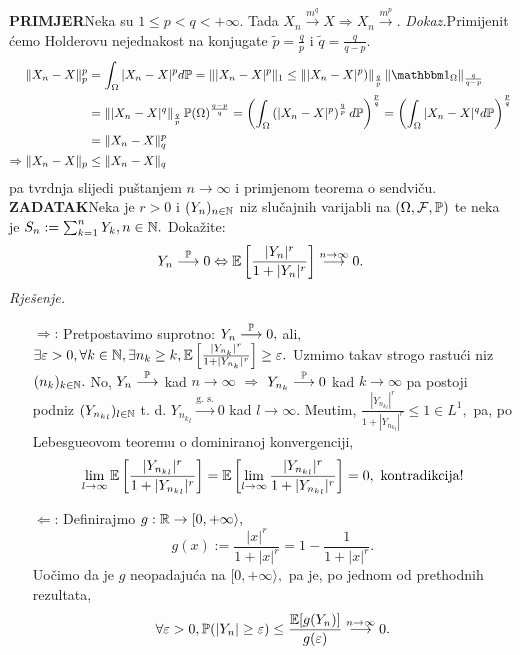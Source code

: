 \documentclass{article}
\begin{document}
\textbf{PRIMJER}\newline Neka su \(1\le p<q<+\infty.\) Tada \(X_n\overset{m^q}{\longrightarrow}X\Rightarrow X_n\overset{m^p}{\longrightarrow}.\)\newline\newline
\textit{Dokaz.}\newline Primijenit ćemo Holderovu nejednakost na konjugate \(\tilde p=\frac{q}p\) i \(\tilde q=\frac{q}{q-p}.\) \[\begin{aligned}\|X_n-X\|_p^p&=\int_\Omega|X_n-X|^pd\Bbb P=\||X_n-X|^p\|_1\le\left\||X_n-X|^p)\right\|_{\frac{q}p}\|\mathbbm 1_\Omega\|_{\frac{q}{q-p}}\\&=\left\||X_n-X|^q\right\|_{\frac{q}p}\Bbb P(\Omega)^{\frac{q-p}q}=\left(\int_\Omega\left(|X_n-X|^p\right)^{\frac{q}p}d\Bbb P\right)^{\frac{p}q}=\left(\int_\Omega|X_n-X|^qd\Bbb P\right)^{\frac{p}q}\\&=\|X_n-X\|_q^p\\\Rightarrow\|X_n-X\|_p&\le\|X_n-X\|_q\end{aligned}\] pa tvrdnja slijedi puštanjem \(n\to\infty\) i primjenom teorema o sendviču. \newline\newline
\textbf{ZADATAK}\newline Neka je \(r>0\) i \((Y_n)_{n\in\Bbb N}\) niz slučajnih varijabli na \((\Omega,\mathcal F,\Bbb P)\) te neka je \(S_n:=\sum_{k=1}^nY_k,n\in\Bbb N.\) Dokažite: \[Y_n\overset{\Bbb P}{\longrightarrow}0\Leftrightarrow\Bbb E\left[\frac{|Y_n|^r}{1+|Y_n|^r}\right]\overset{n\to\infty}{\longrightarrow}0.\]
\textit{Rješenje.}
\begin{enumerate}
    \item[\(\boxed{\Rightarrow}\):] Pretpostavimo suprotno: \(Y_n\overset{\Bbb P}{\longrightarrow}0,\) ali, \(\exists\varepsilon>0,\forall k\in\Bbb N,\exists n_k\ge k,\Bbb E\left[\frac{|Y_{n_k}|^r}{1+|Y_{n_k}|^r}\right]\ge\varepsilon.\) Uzmimo takav strogo rastući niz \((n_k)_{k\in\Bbb N}.\) No, \(Y_n\overset{\Bbb P}{\longrightarrow}\) kad \(n\to\infty\) \(\Rightarrow\) \(Y_{n_k}\overset{\Bbb P}{\longrightarrow}0\) kad \(k\to\infty\) pa postoji podniz \((Y_{{n_k}_l})_{l\in\Bbb N}\) t. d. \(Y_{{n_k}_l}\overset{\text{g. s.}}{\longrightarrow}0\) kad \(l\to\infty.\) Me\dj{}utim, \(\frac{|Y_{{n_k}_l}|^r}{1+|Y_{{n_k}_l}|^r}\le 1\in L^1,\) pa, po Lebesgueovom teoremu o dominiranoj konvergenciji, \[\lim_{l\to\infty}\Bbb E\left[\frac{|Y_{{n_k}_l}|^r}{1+|Y_{{n_k}_l}|^r}\right]=\Bbb E\left[\lim_{l\to\infty}\frac{|Y_{{n_k}_l}|^r}{1+|Y_{{n_k}_l}|^r}\right]=0,\text{ kontradikcija!}\] 
    \item[\(\boxed{\Leftarrow}\):] Definirajmo \(g:\Bbb R\to[0,+\infty\rangle,\) \[g(x):=\frac{|x|^r}{1+|x|^r}=1-\frac1{1+|x|^r}.\] Uočimo da je \(g\) neopadajuća na \([0,+\infty\rangle,\) pa je, po jednom od prethodnih rezultata, \[\forall\varepsilon>0,\Bbb P(|Y_n|\ge\varepsilon)\le\frac{\Bbb E[g(Y_n)]}{g(\varepsilon)}\overset{n\to\infty}{\longrightarrow}0.\]
\end{enumerate}
\end{document}
